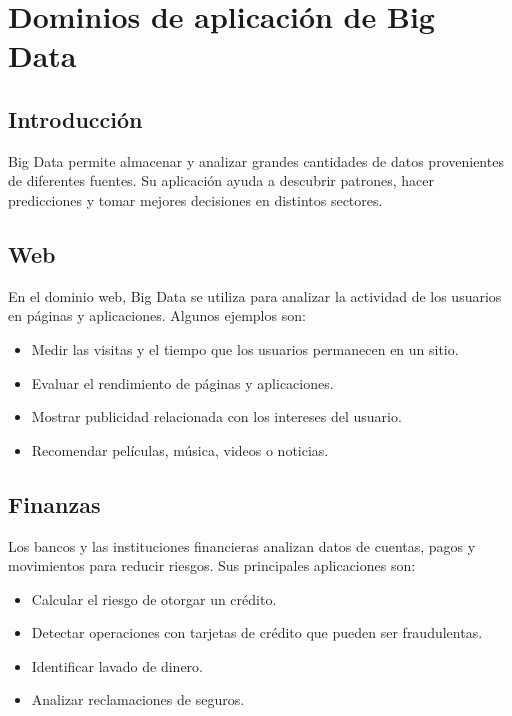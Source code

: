 
\section{Dominios de aplicación de Big Data}

\subsection{Introducción}

Big Data permite almacenar y analizar grandes cantidades de datos provenientes de diferentes fuentes. Su aplicación ayuda a descubrir patrones, hacer predicciones y tomar mejores decisiones en distintos sectores.

\subsection{Web}

En el dominio web, Big Data se utiliza para analizar la actividad de los usuarios en páginas y aplicaciones. Algunos ejemplos son:

\begin{itemize}
    \item Medir las visitas y el tiempo que los usuarios permanecen en un sitio.
    \item Evaluar el rendimiento de páginas y aplicaciones.
    \item Mostrar publicidad relacionada con los intereses del usuario.
    \item Recomendar películas, música, videos o noticias.
\end{itemize}

\subsection{Finanzas}

Los bancos y las instituciones financieras analizan datos de cuentas, pagos y movimientos para reducir riesgos. Sus principales aplicaciones son:

\begin{itemize}
    \item Calcular el riesgo de otorgar un crédito.
    \item Detectar operaciones con tarjetas de crédito que pueden ser fraudulentas.
    \item Identificar lavado de dinero.
    \item Analizar reclamaciones de seguros.
\end{itemize}

